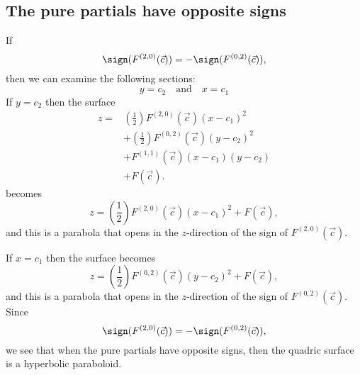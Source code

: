 \documentclass{ximera}
\begin{document}
\subsection{The pure partials have opposite signs}
If
\[
\sign(F^{(2,0)}(\vec{c})) = -\sign(F^{(0,2)}(\vec{c})),
\]
then we can examine the following sections:
\[
y= c_2 \quad\text{and}\quad x = c_1
\]
If $y=c_2$ then the surface
\begin{align*}
  z = &\left(\frac{1}{2}\right)F^{(2,0)}(\vec{c})(x-c_1)^2\\
  &+ \left(\frac{1}{2}\right)F^{(0,2)}(\vec{c})(y-c_2)^2 \\
  &+ F^{(1,1)}(\vec{c}) (x-c_1)(y-c_2)\\
  &+ F(\vec{c}).
\end{align*}
becomes
\[
z = \left(\frac{1}{2}\right)F^{(2,0)}(\vec{c})(x-c_1)^2 + F(\vec{c}),
\]
and this is a parabola that opens in the $z$-direction of the sign of
$F^{(2,0)}(\vec{c})$.

If $x=c_1$ then the surface becomes
\[
z = \left(\frac{1}{2}\right)F^{(0,2)}(\vec{c})(y-c_2)^2 + F(\vec{c}),
\]
and this is a parabola that opens in the $z$-direction of the sign of
$F^{(0,2)}(\vec{c})$. Since 
\[
\sign(F^{(2,0)}(\vec{c})) = -\sign(F^{(0,2)}(\vec{c})),
\]
we see that when the pure partials have opposite signs, then the
quadric surface is a hyperbolic paraboloid.
\end{document}
